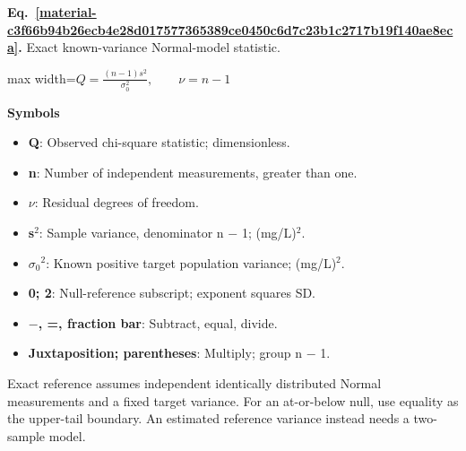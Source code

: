 \documentclass[11pt,a4paper]{article}
\begin{document}
\medskip

\par\medskip
\noindent\begin{minipage}{\linewidth}
\label{material-c3f66b94b26ecb4e28d017577365389ce0450c6d7c23b1c2717b19f140ae8eca}
\noindent\textbf{Eq.~\ref*{material-c3f66b94b26ecb4e28d017577365389ce0450c6d7c23b1c2717b19f140ae8eca}.} Exact known-variance Normal-model statistic.\par\nopagebreak
\begin{center}\begin{adjustbox}{max width=\linewidth}$\displaystyle Q=\frac{(n-1)s^2}{\sigma_0^2},\qquad \nu=n-1$\end{adjustbox}\end{center}

\par\noindent\textbf{Symbols}

\begin{itemize}\setlength{\itemsep}{1pt}\setlength{\parsep}{0pt}
\item \textbf{Q}: Observed chi-square statistic; dimensionless.
\item \textbf{n}: Number of independent measurements, greater than one.
\item \textbf{\ensuremath{\nu}}: Residual degrees of freedom.
\item \textbf{s\ensuremath{{}^2}}: Sample variance, denominator n \ensuremath{-} 1; (mg/L)\ensuremath{{}^2}.
\item \textbf{\ensuremath{\sigma}\ensuremath{{}_0}\ensuremath{{}^2}}: Known positive target population variance; (mg/L)\ensuremath{{}^2}.
\item \textbf{0; 2}: Null-reference subscript; exponent squares SD.
\item \textbf{\ensuremath{-}, =, fraction bar}: Subtract, equal, divide.
\item \textbf{Juxtaposition; parentheses}: Multiply; group n \ensuremath{-} 1.
\end{itemize}

Exact reference assumes independent identically distributed Normal measurements and a fixed target variance. For an at-or-below null, use equality as the upper-tail boundary. An estimated reference variance instead needs a two-sample model.

\end{minipage}\par
\medskip
\end{document}
